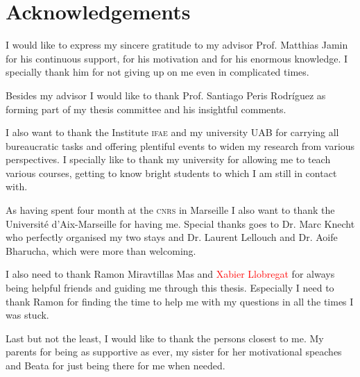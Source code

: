\documentclass[../../index.tex]{subfiles}
\begin{document}
\chapter*{Acknowledgements}
I would like to express my sincere gratitude to my advisor Prof. Matthias Jamin
for his continuous support, for his motivation and for his enormous knowledge. I
specially thank him for not giving up on me even in complicated times.

Besides my advisor I would like to thank Prof. Santiago Peris Rodríguez as
forming part of my thesis committee and his insightful comments.

I also want to thank the Institute \textsc{ifae} and my university \textsc{UAB}
for carrying all bureaucratic tasks and offering plentiful events to widen my
research from various perspectives. I specially like to thank my university for
allowing me to teach various courses, getting to know bright students to which I
am still in contact with.

As having spent four month at the \textsc{cnrs} in Marseille I also want to
thank the Université d'Aix-Marseille for having me. Special thanks goes to Dr.
Marc Knecht who perfectly organised my two stays and Dr. Laurent Lellouch and
Dr. Aoife Bharucha, which were more than welcoming.

I also need to thank Ramon Miravtillas Mas and \textcolor{red}{Xabier Llobregat}
for always being helpful friends and guiding me through this thesis. Especially
I need to thank Ramon for finding the time to help me with my questions in all
the times I was stuck.

Last but not the least, I would like to thank the persons closest to me. My
parents for being as supportive as ever, my sister for her motivational speaches
and Beata for just being there for me when needed.
\end{document}
